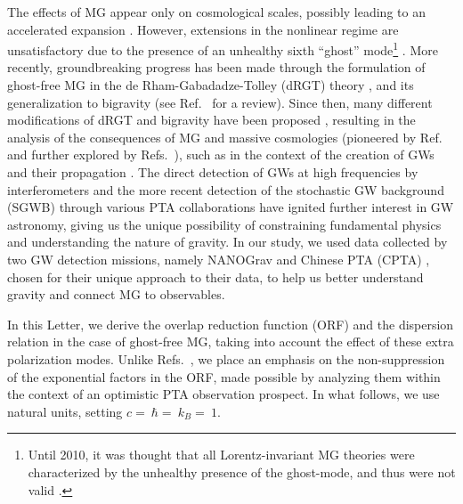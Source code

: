 \documentclass[10pt,prd,twocolumn,aps,nofootinbib,nobibnotes,superscriptaddress,preprintnumbers]{revtex4-2}
\begin{document}
The effects of MG appear only on cosmological scales, possibly leading to an accelerated expansion \cite{DAmico:2011eto}. However, extensions in the nonlinear regime are unsatisfactory due to the presence of an unhealthy sixth ``ghost'' mode\footnote{Until 2010, it was thought that all Lorentz-invariant MG theories were characterized by the unhealthy presence of the ghost-mode, and thus were not valid \cite{deRham:2010kj}.} \cite{Boulware:1972yco}. More recently, groundbreaking progress has been made through the formulation of ghost-free MG in the de Rham-Gabadadze-Tolley (dRGT) theory \cite{deRham:2010ik,deRham:2010kj}, and its generalization to bigravity \cite{Hassan:2011zd} (see Ref.~\cite{deRham:2023ngf} for a review). Since then, many different modifications of dRGT and bigravity have been proposed \cite{Hinterbichler:2011tt,deRham:2014zqa,Koyama:2015vza,deRham:2016nuf,Hinterbichler:2016try, Cusin:2016ytz, Kenna-Allison:2019tbu, Kazempour:2022giy,Hogas:2021saw,Hogas:2021lns,Hogas:2021fmr,Hogas:2019ywm,Gialamas:2025ciw,Gialamas:2023fly,Gialamas:2023lxj,Gialamas:2023aim,Dwivedi:2024okk},  
resulting in the analysis of the consequences of MG and massive cosmologies (pioneered by Ref.~\cite{DAmico:2011eto} and further explored by Refs.~\cite{Gratia:2012wt,Gumrukcuoglu:2012aa,Maeda:2013bha,Akrami:2013pna,Zhang:2013noa,Lambiase:2012fv,Koyama:2011wx,Tasinato:2012ze,Solomon:2014iwa,Akrami:2013ffa,Koennig:2014ods,Gumrukcuoglu:2016hic, Heisenberg:2024uwq, Smirnov:2025yru, Comelli:2013tja}),
such as in the context of the creation of GWs and their propagation \cite{DeFelice:2013awa,Gumrukcuoglu:2013nza,DeFelice:2013bxa,DeFelice:2015moy,Babichev:2015xha,Sakstein:2017bws}. 
The direct detection of GWs at high frequencies by interferometers \cite{LIGOScientific:2016aoc,LIGOScientific:2016sjg, KAGRA:2020agh, VIRGO:2014yos} and the more recent detection of the stochastic GW background (SGWB) through various PTA collaborations \cite{Agazie:2023, Xu:2023wog,EPTA:2023sfo,EPTA:2023akd,EPTA:2023fyk, Zic:2023gta,Reardon:2023gzh} have ignited further interest in GW astronomy, giving us the unique possibility of constraining fundamental physics and understanding the nature of gravity. 
In our study, we used data collected by two GW detection missions, namely NANOGrav \cite{Agazie:2023} and Chinese PTA (CPTA) \cite{Xu:2023wog}, chosen for their unique approach to their data, to help us better understand gravity and connect MG to observables. 

In this Letter, we derive the overlap reduction function (ORF) and the dispersion relation in the case of ghost-free MG, taking into account the effect of these extra polarization modes. 
Unlike Refs.~\cite{Liang:2021bct, Anholm:2008wy, Arjona:2024cex, Lee:2013awh, Bernardo:2023mxc, Bernardo:2023pwt, Bernardo:2023zna, Bernardo:2024bdc}, we place an emphasis on the non-suppression of the exponential factors in the ORF, made possible by analyzing them within the context of an optimistic PTA observation prospect. In what follows, we use natural units, setting $c = $$\ \hbar = $$\ k_B = $$\ 1$.
\end{document}
